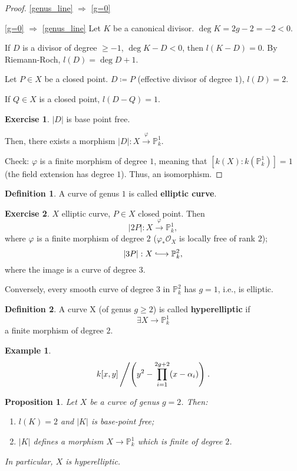 \documentclass[12pt]{article}
\newtheorem*{proposition}{Proposition}
\theoremstyle{definition}
\newtheorem*{definition}{Definition}
\newtheorem*{exercise}{Exercise}
\newtheorem*{example}{Example}
\begin{document}
\begin{proof}
\ref{genus_line} $\Rightarrow$ \ref{g=0} \checkmark

\ref{g=0} $\Rightarrow$ \ref{genus_line} Let $K$ be a canonical divisor. $\deg K=2g-2=-2<0$.

If $D$ is a divisor of degree $\geq-1$, $\deg K-D<0$, then $l(K-D)=0$. By Riemann-Roch, $l(D)=\deg D+1$.

Let $P\in X$ be a closed point. $D\coloneqq P$ (effective divisor of degree $1$), $l(D)=2$.

If $Q\in X$ is a closed point, $l(D-Q)=1$.

\begin{exercise}
$|D|$ is base point free.
\end{exercise}

Then, there exists a morphism $|D|:X\xrightarrow{\varphi}\mathbb{P}_k^1$.

Check: $\varphi$ is a finite morphism of degree $1$, meaning that $[k(X):k(\mathbb{P}_k^1)]=1$ (the field extension has degree $1$). Thus, an isomorphism.
\end{proof}

\begin{definition}
A curve of genus $1$ is called \textbf{elliptic curve}.
\end{definition}

\begin{exercise}
$X$ elliptic curve, $P\in X$ closed point. Then
\[|2P|:X\overset{\varphi}{\longrightarrow}\mathbb{P}_k^1,\]
where $\varphi$ is a finite morphism of degree $2$ ($\varphi_*\mathcal{O}_X$ is locally free of rank $2$);
\[|3P|:X\lhook\joinrel\longrightarrow\mathbb{P}_k^2,\]
where the image is a curve of degree $3$.

Conversely, every smooth curve of degree $3$ in $\mathbb{P}_k^2$ has $g=1$, i.e., is elliptic.
\end{exercise}

\begin{definition}
A curve X (of genus $g\geq2$) is called \textbf{hyperelliptic} if
\[\exists X\longrightarrow\mathbb{P}_k^1\]
a finite morphism of degree $2$.
\end{definition}

\begin{example}
\[k[x,y]\left/\left(y^2-\prod_{i=1}^{2g+2}(x-\alpha_i)\right)\right..\]
\end{example}

\begin{proposition}
Let $X$ be a curve of genus $g=2$. Then:
\begin{enumerate}[label=\arabic*)]
\item $l(K)=2$ and $|K|$ is base-point free;
\item $|K|$ defines a morphism $X\rightarrow\mathbb{P}_k^1$ which is finite of degree $2$.
\end{enumerate}
In particular, $X$ is hyperelliptic.
\end{proposition}
\end{document}
